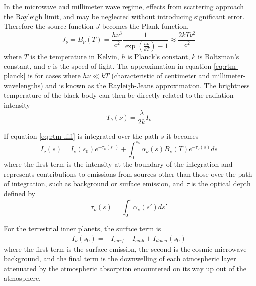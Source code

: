 In the microwave and millimeter wave regime, effects from scattering approach the Rayleigh limit, and may be neglected without introducing significant error. Therefore the source function $J$ becomes the Plank function.
\begin{equation}\label{eq:rtm-planck}
J_\nu = B_\nu(T) = \frac{h\nu^3}{c^2} \frac{1}{\exp(\frac{h\nu}{kT})-1} \approx \frac{2kT\nu^2}{c^2}
\end{equation}
where $T$ is the temperature in Kelvin, $h$ is Planck's constant, $k$ is Boltzman's constant, and $c$ is the speed of light. The approximation in equation \ref{eq:rtm-planck} is for cases where $h\nu \ll kT$ (characteristic of centimeter and millimeter-wavelengths) and is known as the Rayleigh-Jeans approximation. The brightness temperature of the black body can then be directly related to the radiation intensity
\begin{equation}\label{eq:temp-intensity}
T_b(\nu) = \frac{\lambda}{2k}I_\nu
\end{equation}

If equation \ref{eq:rtm-diff} is integrated over the path $s$ it becomes
\begin{equation}\label{eq:rtm-integrated}
I_\nu(s) = I_{\nu}(s_0)e^{-\tau_\nu(s_0)}+\int_0^{s_0} \alpha_\nu(s)B_\nu(T) e^{-\tau_\nu(s)}ds 
\end{equation}
where the first term is the intensity at the boundary of the integration and represents contributions to emissions from sources other than those over the path of integration, such as background or surface emission, and $\tau$ is the optical depth defined by
\begin{equation}\label{eq:rtm-tau}
\tau_\nu(s) = \int_0^s \alpha_\nu(s') ds'
\end{equation}

For the terrestrial inner planets, the surface term is 
\begin{equation}\label{eq:rtm-surface-term}
\begin{split}
I_{\nu}(s_0) =& I_{surf} + I_{cmb}+ I_{down}(s_0)
\end{split}
\end{equation}
where the first term is the surface emission, the second is the cosmic microwave background, and the final term is the downwelling of each atmospheric layer attenuated by the atmospheric absorption encountered on its way up out of the atmosphere. 

